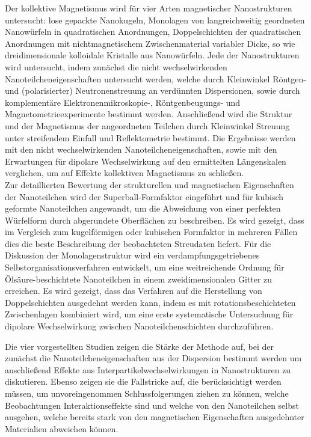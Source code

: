 \documentclass[\main/dresen_thesis.tex]{subfiles}
\begin{document}
  Der kollektive Magnetismus wird für vier Arten magnetischer Nanostrukturen untersucht: lose gepackte Nanokugeln, Monolagen von langreichweitig geordneten Nanowürfeln in quadratischen Anordnungen, Doppelschichten der quadratischen Anordnungen mit nichtmagnetischem Zwischenmaterial variabler Dicke, so wie dreidimensionale kolloidale Kristalle aus Nanowürfeln.
  Jede der Nanostrukturen wird untersucht, indem zunächst die nicht wechselwirkenden Nanoteilcheneigenschaften untersucht werden, welche durch Kleinwinkel Röntgen- und (polarisierter) Neutronenstreuung an verdünnten Dispersionen, sowie durch komplementäre Elektronenmikroskopie-, Röntgenbeugungs- und Magnetometrieexperimente bestimmt werden.
  Anschließend wird die Struktur und der Magnetismus der angeordneten Teilchen durch Kleinwinkel Streuung unter streifendem Einfall und Reflektometrie bestimmt.
  Die Ergebnisse werden mit den nicht wechselwirkenden Nanoteilcheneigenschaften, sowie mit den Erwartungen für dipolare Wechselwirkung auf den ermittelten Längenskalen verglichen, um auf Effekte kollektiven Magnetismus zu schließen.
  \\

  Zur detaillierten Bewertung der strukturellen und magnetischen Eigenschaften der Nanoteilchen wird der Superball-Formfaktor eingeführt und für kubisch geformte Nanoteilchen angewandt, um die Abweichung von einer perfekten Würfelform durch abgerundete Oberflächen zu beschreiben.
  Es wird gezeigt, dass im Vergleich zum kugelförmigen oder kubischen Formfaktor in mehreren Fällen dies die beste Beschreibung der beobachteten Streudaten liefert.
  Für die Diskussion der Monolagenstruktur wird ein verdampfungsgetriebenes Selbstorganisationsverfahren entwickelt, um eine weitreichende Ordnung für Ölsäure-beschichtete Nanoteilchen in einem zweidimensionalen Gitter zu erreichen.
  Es wird gezeigt, dass das Verfahren auf die Herstellung von Doppelschichten ausgedehnt werden kann, indem es mit rotationsbeschichteten Zwischenlagen kombiniert wird, um eine erste systematische Untersuchung für dipolare Wechselwirkung zwischen Nanoteilchenschichten durchzuführen.

  Die vier vorgestellten Studien zeigen die Stärke der Methode auf, bei der zunächst die Nanoteilcheneigenschaften aus der Dispersion bestimmt werden um anschließend Effekte aus Interpartikelwechselwirkungen in Nanostrukturen zu diskutieren.
  Ebenso zeigen sie die Fallstricke auf, die berücksichtigt werden müssen, um unvoreingenommen Schlussfolgerungen ziehen zu können, welche Beobachtungen Interaktionseffekte sind und welche von den Nanoteilchen selbst ausgehen, welche bereits stark von den magnetischen Eigenschaften ausgedehnter Materialien abweichen können.
\end{document}
